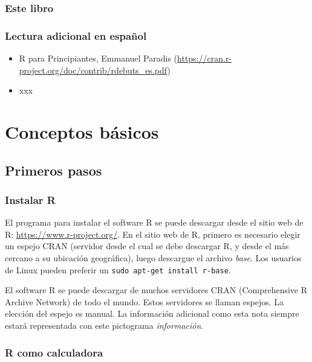 \documentclass[]{book}
\makeatletter
\providecommand{\tightlist}{%
  \setlength{\itemsep}{0pt}\setlength{\parskip}{0pt}}
\newenvironment{kframe}{%
\medskip{}
\setlength{\fboxsep}{.8em}
 \def\at@end@of@kframe{}%
 \ifinner\ifhmode%
  \def\at@end@of@kframe{\end{minipage}}%
  \begin{minipage}{\columnwidth}%
 \fi\fi%
 \def\FrameCommand##1{\hskip\@totalleftmargin \hskip-\fboxsep
 \colorbox{shadecolor}{##1}\hskip-\fboxsep
     \hskip-\linewidth \hskip-\@totalleftmargin \hskip\columnwidth}%
 \MakeFramed {\advance\hsize-\width
   \@totalleftmargin\z@ \linewidth\hsize
   \@setminipage}}%
 {\par\unskip\endMakeFramed%
 \at@end@of@kframe}
\newenvironment{rmdblock}[1]
  {
  \begin{itemize}
  \renewcommand{\labelitemi}{
    \raisebox{-.7\height}[0pt][0pt]{
      {\setkeys{Gin}{width=3em,keepaspectratio}\texttt{[image: myIcons/\#1]}} %
    }
  }
  \setlength{\fboxsep}{1em}
  \begin{kframe}
  \item
  }
  {
  \end{kframe}
  \end{itemize}
  }
\newenvironment{rmdnote}      %
  {\begin{rmdblock}{note}}    %
  {\end{rmdblock}}            %
\makeatother
\begin{document}
\section{Este libro}\label{este-libro}

\section{Lectura adicional en
español}\label{lectura-adicional-en-espanol}

\begin{itemize}
\tightlist
\item
  R para Principiantes, Emmanuel Paradis
  (\url{https://cran.r-project.org/doc/contrib/rdebuts_es.pdf})
\item
  xxx
\end{itemize}

\part{Conceptos básicos}\label{part-conceptos-basicos}

\chapter{Primeros pasos}\label{premiersPas}

\section{Instalar R}\label{instalar-r}

El programa para instalar el software R se puede descargar desde el
sitio web de R: \url{https://www.r-project.org/}. En el sitio web de R,
primero es necesario elegir un espejo CRAN (servidor desde el cual se
debe descargar R, y desde el más cercano a su ubicación geográfica),
luego descargue el archivo \emph{base}. Los usuarios de Linux pueden
preferir un \texttt{sudo\ apt-get\ install\ r-base}.

\begin{rmdnote}
El software R se puede descargar de muchos servidores CRAN
(Comprehensive R Archive Network) de todo el mundo. Estos servidores se
llaman espejos. La elección del espejo es manual. La información
adicional como esta nota siempre estará representada con este pictograma
\emph{información}.
\end{rmdnote}

\section{R como calculadora}\label{r-como-calculadora}
\end{document}
